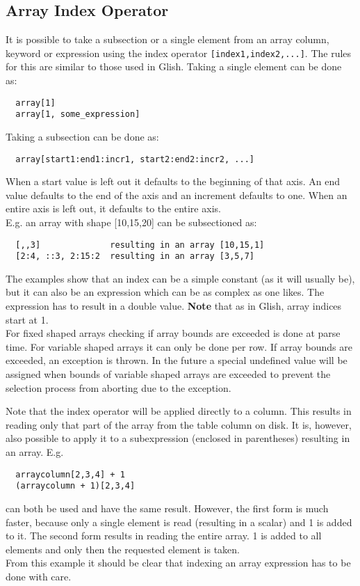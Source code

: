\subsection{\label{TAQL:INDEXING}Array Index Operator}
It is possible to take a subsection or a
single element from an array column, keyword or expression
using the index operator
\texttt{[index1,index2,...]}. The rules for this
are similar to those used in Glish.
Taking a single element can be done as:
\begin{verbatim}
  array[1]
  array[1, some_expression]
\end{verbatim}
Taking a subsection can be done as:
\begin{verbatim}
  array[start1:end1:incr1, start2:end2:incr2, ...]
\end{verbatim}
When a start value is left out it defaults to the beginning of
that axis. An end value defaults to the end of the axis and
an increment defaults to one. When an entire axis is left out,
it defaults to the entire axis.
\\E.g. an array with shape [10,15,20] can be subsectioned as:
\begin{verbatim}
  [,,3]              resulting in an array [10,15,1]
  [2:4, ::3, 2:15:2  resulting in an array [3,5,7]
\end{verbatim}
The examples show that an index can be a simple constant (as it will
usually be), but it can also be an expression which can be as complex
as one likes. The expression has to result in a double value.
\textbf{Note} that as in Glish, array indices start at 1.
\\For fixed shaped arrays checking if array bounds are exceeded
is done at parse time.
For variable shaped arrays
it can only be done per row. If array bounds are exceeded,
an exception is thrown. In the future a special undefined value
will be assigned when bounds of variable shaped arrays are exceeded
to prevent the selection process from aborting due to the exception.

Note that the index operator will be applied directly
to a column. This results in reading only that part of the
array from the table column on disk.
It is, however, also possible to apply it to a
subexpression (enclosed in parentheses) resulting in an array.
E.g.
\begin{verbatim}
  arraycolumn[2,3,4] + 1
  (arraycolumn + 1)[2,3,4]
\end{verbatim}
can both be used and have the same result. However, the first
form is much faster, because only a single element is read
(resulting in a scalar) and 1 is added to it.
The second form results in reading the entire array.
1 is added to all elements and only then the requested element is taken.
\\From this example it should be clear that indexing an array
expression has to be done with care.

